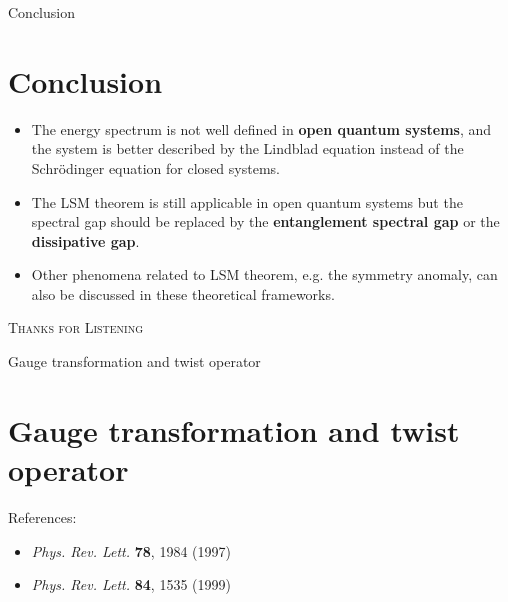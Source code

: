 \documentclass[professionalfont]{beamer}
\theoremstyle{definition}
\begin{document}
\begin{frame}{Conclusion}
\section{Conclusion}
\begin{itemize}
    \item The energy spectrum is not well defined in \textbf{open quantum systems}, and the system is better described by the Lindblad equation instead of the Schr\"odinger equation for closed systems.
    \item The LSM theorem is still applicable in open quantum systems but the spectral gap should be replaced by the \textbf{entanglement spectral gap} or the \textbf{dissipative gap}.
    \item Other phenomena related to LSM theorem, e.g. the symmetry anomaly, can also be discussed in these theoretical frameworks.
\end{itemize}
\end{frame}
\begin{frame}
\centering
\Huge
    \textsc{Thanks for Listening}
\end{frame}
\appendix
\begin{frame}{Gauge transformation and twist operator}
\section{Gauge transformation and twist operator}

References:
\begin{itemize}
    \item \textit{Phys. Rev. Lett.} \textbf{78}, 1984 (1997)
    \item \emph{Phys. Rev. Lett.} \textbf{84}, 1535 (1999)
\end{itemize}
\end{frame}
\end{document}
